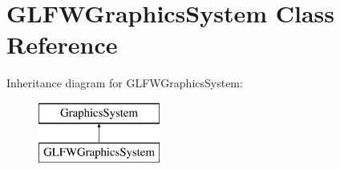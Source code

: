 \hypertarget{class_g_l_f_w_graphics_system}{}\section{G\+L\+F\+W\+Graphics\+System Class Reference}
\label{class_g_l_f_w_graphics_system}
Inheritance diagram for G\+L\+F\+W\+Graphics\+System\+:\begin{figure}[H]
\begin{center}
\leavevmode
\includegraphics[height=2.000000cm]{class_g_l_f_w_graphics_system}
\end{center}
\end{figure}
